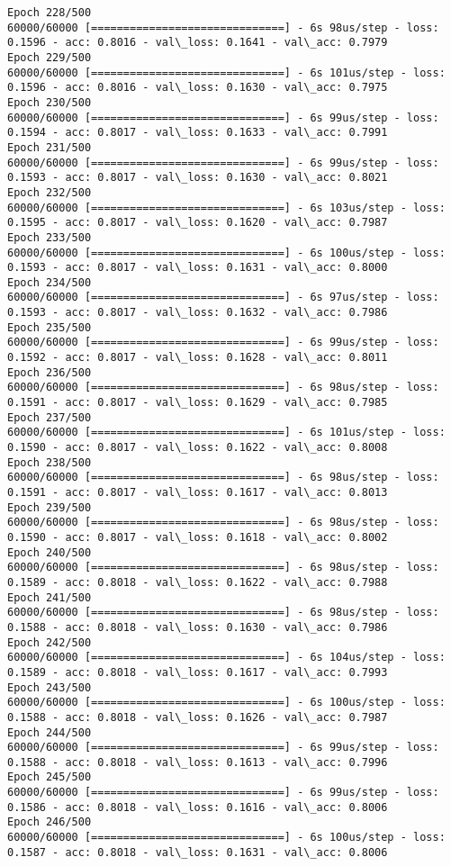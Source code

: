 \documentclass[11pt]{article}
\begin{document}
\begin{Verbatim}[commandchars=\\\{\}]
Epoch 228/500
60000/60000 [==============================] - 6s 98us/step - loss: 0.1596 - acc: 0.8016 - val\_loss: 0.1641 - val\_acc: 0.7979
Epoch 229/500
60000/60000 [==============================] - 6s 101us/step - loss: 0.1596 - acc: 0.8016 - val\_loss: 0.1630 - val\_acc: 0.7975
Epoch 230/500
60000/60000 [==============================] - 6s 99us/step - loss: 0.1594 - acc: 0.8017 - val\_loss: 0.1633 - val\_acc: 0.7991
Epoch 231/500
60000/60000 [==============================] - 6s 99us/step - loss: 0.1593 - acc: 0.8017 - val\_loss: 0.1630 - val\_acc: 0.8021
Epoch 232/500
60000/60000 [==============================] - 6s 103us/step - loss: 0.1595 - acc: 0.8017 - val\_loss: 0.1620 - val\_acc: 0.7987
Epoch 233/500
60000/60000 [==============================] - 6s 100us/step - loss: 0.1593 - acc: 0.8017 - val\_loss: 0.1631 - val\_acc: 0.8000
Epoch 234/500
60000/60000 [==============================] - 6s 97us/step - loss: 0.1593 - acc: 0.8017 - val\_loss: 0.1632 - val\_acc: 0.7986
Epoch 235/500
60000/60000 [==============================] - 6s 99us/step - loss: 0.1592 - acc: 0.8017 - val\_loss: 0.1628 - val\_acc: 0.8011
Epoch 236/500
60000/60000 [==============================] - 6s 98us/step - loss: 0.1591 - acc: 0.8017 - val\_loss: 0.1629 - val\_acc: 0.7985
Epoch 237/500
60000/60000 [==============================] - 6s 101us/step - loss: 0.1590 - acc: 0.8017 - val\_loss: 0.1622 - val\_acc: 0.8008
Epoch 238/500
60000/60000 [==============================] - 6s 98us/step - loss: 0.1591 - acc: 0.8017 - val\_loss: 0.1617 - val\_acc: 0.8013
Epoch 239/500
60000/60000 [==============================] - 6s 98us/step - loss: 0.1590 - acc: 0.8017 - val\_loss: 0.1618 - val\_acc: 0.8002
Epoch 240/500
60000/60000 [==============================] - 6s 98us/step - loss: 0.1589 - acc: 0.8018 - val\_loss: 0.1622 - val\_acc: 0.7988
Epoch 241/500
60000/60000 [==============================] - 6s 98us/step - loss: 0.1588 - acc: 0.8018 - val\_loss: 0.1630 - val\_acc: 0.7986
Epoch 242/500
60000/60000 [==============================] - 6s 104us/step - loss: 0.1589 - acc: 0.8018 - val\_loss: 0.1617 - val\_acc: 0.7993
Epoch 243/500
60000/60000 [==============================] - 6s 100us/step - loss: 0.1588 - acc: 0.8018 - val\_loss: 0.1626 - val\_acc: 0.7987
Epoch 244/500
60000/60000 [==============================] - 6s 99us/step - loss: 0.1588 - acc: 0.8018 - val\_loss: 0.1613 - val\_acc: 0.7996
Epoch 245/500
60000/60000 [==============================] - 6s 99us/step - loss: 0.1586 - acc: 0.8018 - val\_loss: 0.1616 - val\_acc: 0.8006
Epoch 246/500
60000/60000 [==============================] - 6s 100us/step - loss: 0.1587 - acc: 0.8018 - val\_loss: 0.1631 - val\_acc: 0.8006

\end{Verbatim}
\end{document}
